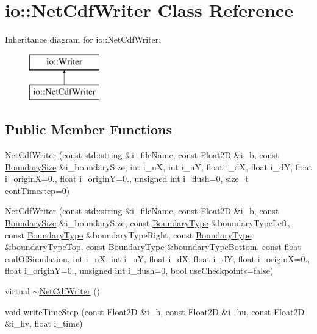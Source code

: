 \hypertarget{classio_1_1NetCdfWriter}{\section{io\-:\-:Net\-Cdf\-Writer Class Reference}
\label{classio_1_1NetCdfWriter}
}
Inheritance diagram for io\-:\-:Net\-Cdf\-Writer\-:\begin{figure}[H]
\begin{center}
\leavevmode
\includegraphics[height=2.000000cm]{classio_1_1NetCdfWriter}
\end{center}
\end{figure}
\subsection*{Public Member Functions}
\begin{DoxyCompactItemize}
\item 
\hyperlink{classio_1_1NetCdfWriter_afb378e970e3f004612cfc36a0c171805}{Net\-Cdf\-Writer} (const std\-::string \&i\-\_\-file\-Name, const \hyperlink{classFloat2D}{Float2\-D} \&i\-\_\-b, const \hyperlink{structio_1_1BoundarySize}{Boundary\-Size} \&i\-\_\-boundary\-Size, int i\-\_\-n\-X, int i\-\_\-n\-Y, float i\-\_\-d\-X, float i\-\_\-d\-Y, float i\-\_\-origin\-X=0., float i\-\_\-origin\-Y=0., unsigned int i\-\_\-flush=0, size\-\_\-t cont\-Timestep=0)
\item 
\hyperlink{classio_1_1NetCdfWriter_af9066dce4d7c62ef038a10e1244085b0}{Net\-Cdf\-Writer} (const std\-::string \&i\-\_\-file\-Name, const \hyperlink{classFloat2D}{Float2\-D} \&i\-\_\-b, const \hyperlink{structio_1_1BoundarySize}{Boundary\-Size} \&i\-\_\-boundary\-Size, const \hyperlink{SWE__Scenario_8hh_af75d5dd7322fa39ed0af4e7839e600f8}{Boundary\-Type} \&boundary\-Type\-Left, const \hyperlink{SWE__Scenario_8hh_af75d5dd7322fa39ed0af4e7839e600f8}{Boundary\-Type} \&boundary\-Type\-Right, const \hyperlink{SWE__Scenario_8hh_af75d5dd7322fa39ed0af4e7839e600f8}{Boundary\-Type} \&boundary\-Type\-Top, const \hyperlink{SWE__Scenario_8hh_af75d5dd7322fa39ed0af4e7839e600f8}{Boundary\-Type} \&boundary\-Type\-Bottom, const float end\-Of\-Simulation, int i\-\_\-n\-X, int i\-\_\-n\-Y, float i\-\_\-d\-X, float i\-\_\-d\-Y, float i\-\_\-origin\-X=0., float i\-\_\-origin\-Y=0., unsigned int i\-\_\-flush=0, bool use\-Checkpoints=false)
\item 
virtual \hyperlink{classio_1_1NetCdfWriter_ace10f1b56bbb4a1b6c2092ed661a1a0d}{$\sim$\-Net\-Cdf\-Writer} ()
\item 
void \hyperlink{classio_1_1NetCdfWriter_a8e49f21f16b1720a348de50485754b0c}{write\-Time\-Step} (const \hyperlink{classFloat2D}{Float2\-D} \&i\-\_\-h, const \hyperlink{classFloat2D}{Float2\-D} \&i\-\_\-hu, const \hyperlink{classFloat2D}{Float2\-D} \&i\-\_\-hv, float i\-\_\-time)
\end{DoxyCompactItemize}
